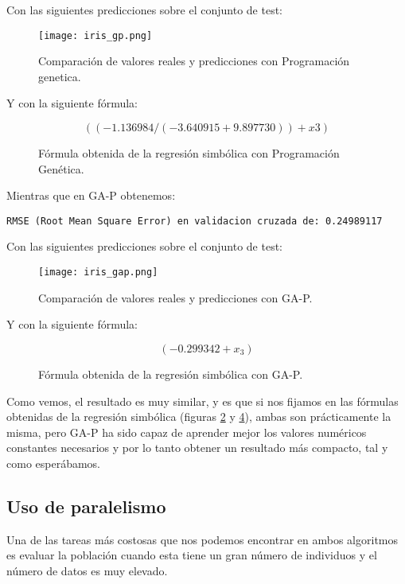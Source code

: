 Con las siguientes predicciones sobre el conjunto de test:

\begin{figure}[H]
	 \centering
	 \texttt{[image: iris\_gp.png]}
	 \caption{Comparación de valores reales y predicciones con Programación genetica.}
	\label{fig:iris_gp}
\end{figure}

Y con la siguiente fórmula:

\begin{figure}[H]
	 \centering
	 $$( ( -1.136984  / ( -3.640915  +  9.897730 ) ) +  x3 )$$
	 \caption{Fórmula obtenida de la regresión simbólica con Programación Genética.}
	\label{fig:formula_iris_gp}
\end{figure}

Mientras que en GA-P obtenemos:

\begin{lstlisting}
RMSE (Root Mean Square Error) en validacion cruzada de: 0.24989117
\end{lstlisting}

Con las siguientes predicciones sobre el conjunto de test:

\begin{figure}[H]
	 \centering
	 \texttt{[image: iris\_gap.png]}
	 \caption{Comparación de valores reales y predicciones con GA-P.}
	\label{fig:iris_gap}
\end{figure}

Y con la siguiente fórmula:

\begin{figure}[H]
	 \centering
	 $$( -0.299342  +  x_3 )$$
	 \caption{Fórmula obtenida de la regresión simbólica con GA-P.}
	\label{fig:formula_iris_gap}
\end{figure}

Como vemos, el resultado es muy similar, y es que si nos fijamos en las fórmulas obtenidas de la regresión simbólica (figuras \ref{fig:formula_iris_gp} y \ref{fig:formula_iris_gap}), ambas son prácticamente la misma, pero GA-P ha sido capaz de aprender mejor los valores numéricos constantes necesarios y por lo tanto obtener un resultado más compacto, tal y como esperábamos.

\newpage

\subsection{Uso de paralelismo}

Una de las tareas más costosas que nos podemos encontrar en ambos algoritmos es evaluar la población cuando esta tiene un gran número de individuos y el número de datos es muy elevado.

